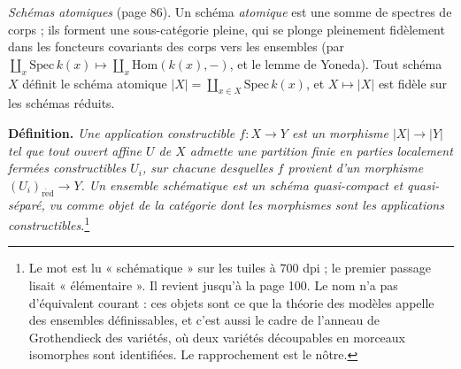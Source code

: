 \documentclass[11pt,a4paper]{article}
\begin{document}
\emph{Schémas atomiques} (page 86). Un schéma \emph{atomique} est une somme de
spectres de corps ; ils forment une sous-catégorie pleine, qui se plonge
pleinement fidèlement dans les foncteurs covariants des corps vers les
ensembles (par $\coprod_x \mathrm{Spec}\,k(x) \mapsto \coprod_x \mathrm{Hom}(k(x),
-)$, et le lemme de Yoneda). Tout schéma $X$ définit le schéma atomique $|X| =
\coprod_{x \in X} \mathrm{Spec}\,k(x)$, et $X \mapsto |X|$ est fidèle sur les
schémas réduits.

\textbf{Définition.} \emph{Une application constructible $f : X \to Y$ est un
morphisme $|X| \to |Y|$ tel que tout ouvert affine $U$ de $X$ admette une
partition finie en parties localement fermées constructibles $U_i$, sur
chacune desquelles $f$ provient d'un morphisme $(U_i)_{\mathrm{r\acute ed}} \to Y$.
Un ensemble schématique est un schéma quasi-compact et quasi-séparé, vu comme
objet de la catégorie dont les morphismes sont les applications
constructibles.}\footnote{Le mot est lu « schématique » sur les tuiles à
700 dpi ; le premier passage lisait « élémentaire ». Il revient jusqu'à la
page 100. Le nom n'a pas d'équivalent courant : ces objets sont ce que la
théorie des modèles appelle des ensembles définissables, et c'est aussi le
cadre de l'anneau de Grothendieck des variétés, où deux variétés découpables
en morceaux isomorphes sont identifiées. Le rapprochement est le nôtre.}
\end{document}
